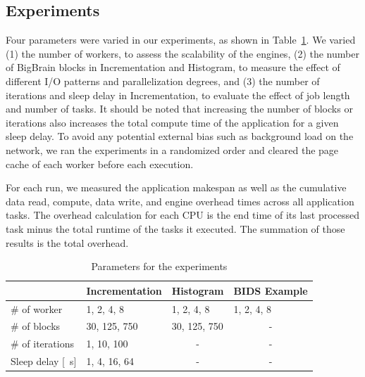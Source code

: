 \documentclass[conference]{IEEEtran}
\begin{document}
\subsection{Experiments}

Four parameters were varied in our experiments, as shown in
Table~\ref{tab:param}. We varied (1) the number of workers, to assess the
scalability of the engines, (2) the number of BigBrain blocks in
Incrementation and Histogram, to measure the effect of different I/O patterns
and parallelization degrees, and (3) the number of iterations and sleep
delay in Incrementation, to evaluate the effect of job length and number of
tasks.
It should be noted that increasing the number of blocks or iterations also
increases the total compute time of the application for a given sleep
delay. To avoid any potential external bias such as background load on the
network, we ran the experiments in a randomized order and cleared the page
cache of each worker before each execution.

For each run, we measured the application makespan as well as the cumulative 
data read, compute, data write, and engine overhead times across all application
tasks. 
The overhead calculation for each CPU is the end time of its last processed task
minus the total runtime of the tasks it executed. The summation of those results is the
total overhead.


\begin{table}[!t]
    \renewcommand{\arraystretch}{1.3}
    \caption{Parameters for the experiments}\label{tab:param}
    \centering
    \begin{tabular*}{\columnwidth}{llll}
    \hline
                        & Incrementation & Histogram             & BIDS Example          \\ \hline
    \# of worker        & 1, 2, 4, 8     & 1, 2, 4, 8            & 1, 2, 4, 8            \\
    \# of blocks        & 30, 125, 750   & 30, 125, 750          & \multicolumn{1}{c}{-} \\
    \# of iterations    & 1, 10, 100     & \multicolumn{1}{c}{-} & \multicolumn{1}{c}{-} \\
    Sleep delay {[}\SI{}{\second}{]} & 1, 4, 16, 64   & \multicolumn{1}{c}{-} & \multicolumn{1}{c}{-} \\ \hline
    \end{tabular*}
    \end{table}
\end{document}
